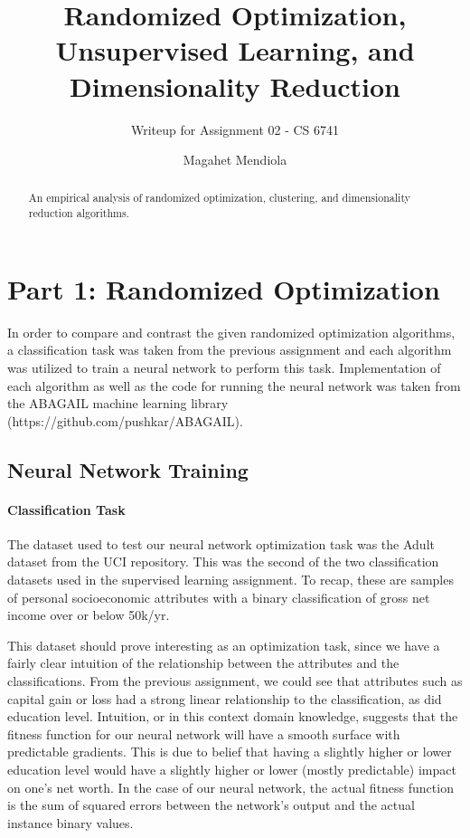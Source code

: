\documentclass{sig-alternate}
\begin{document}
\title{Randomized Optimization, Unsupervised Learning, and Dimensionality Reduction}
\subtitle{Writeup for Assignment 02 - CS 6741}

\author{
\alignauthor
Magahet Mendiola
}
\date{}

\maketitle
\begin{abstract}
An empirical analysis of randomized optimization, clustering, and dimensionality reduction algorithms.
\end{abstract}


\section{Part 1: Randomized Optimization}

In order to compare and contrast the given randomized optimization algorithms, a classification task was taken from the previous assignment and each algorithm was utilized to train a neural network to perform this task. Implementation of each algorithm as well as the code for running the neural network was taken from the ABAGAIL machine learning library (https://github.com/pushkar/ABAGAIL).

\subsection{Neural Network Training}

\paragraph{Classification Task}

The dataset used to test our neural network optimization task was the Adult dataset from the UCI repository. This was the second of the two classification datasets used in the supervised learning assignment. To recap, these are samples of personal socioeconomic attributes with a binary classification of gross net income over or below 50k/yr.

This dataset should prove interesting as an optimization task, since we have a fairly clear intuition of the relationship between the attributes and the classifications. From the previous assignment, we could see that attributes such as capital gain or loss had a strong linear relationship to the classification, as did education level. Intuition, or in this context domain knowledge, suggests that the fitness function for our neural network will have a smooth surface with predictable gradients. This is due to belief that having a slightly higher or lower education level would have a slightly higher or lower (mostly predictable) impact on one's net worth. In the case of our neural network, the actual fitness function is the sum of squared errors between the network's output and the actual instance binary values.
\end{document}
